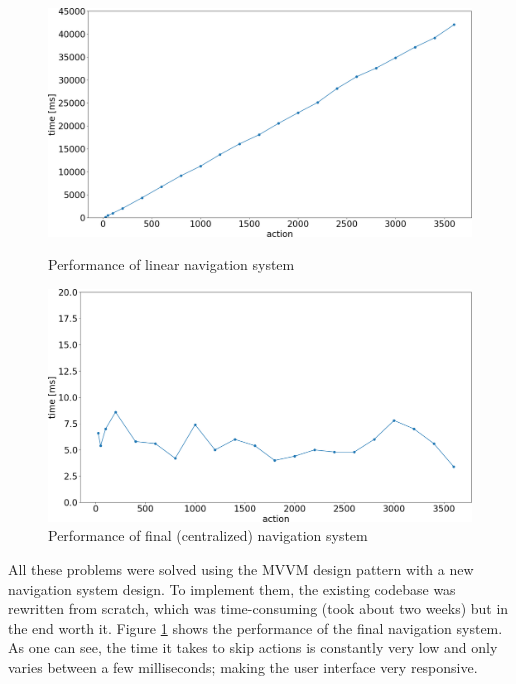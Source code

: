 \begin{figure}[!hbt]
\centering
\includegraphics[width=\textwidth]{figures/pyplot/performance_navsystem-linear.png}
\caption{Performance of linear navigation system}
\label{fig:navsystem.performance.linear}
\centering
\includegraphics[width=\textwidth]{figures/pyplot/performance_navsystem-central.png}
\caption{Performance of final (centralized) navigation system}
\label{fig:navsystem.performance.central}
\end{figure}

\noindent
All these problems were solved using the MVVM design pattern with a new navigation system design. To implement them, the existing codebase was rewritten from scratch, which was time-consuming (took about two weeks) but in the end worth it. Figure \ref{fig:navsystem.performance.central} shows the performance of the final navigation system. As one can see, the time it takes to skip actions is constantly very low and only varies between a few milliseconds; making the user interface very responsive.

